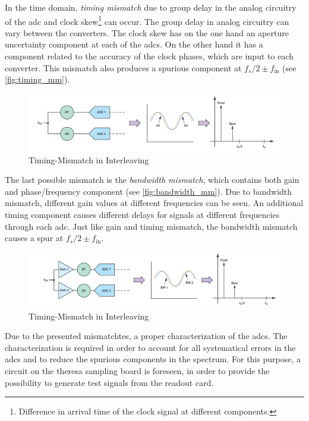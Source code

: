 In the time domain, \textit{timing mismatch} due to group delay in the analog circuitry of the \gls{adc} and clock skew\footnote{Difference in arrival time of the clock signal at different components.} can occur. 
The group delay in analog circuitry can vary between the converters. 
The clock skew has on the one hand an aperture uncertainty component at each of the \glspl{adc}. 
On the other hand it has a component related to the accuracy of the clock phases, which are input to each converter. \cite{Harris2019} 
This mismatch also produces a spurious component at $f_s/2 \pm f_\text{in}$ (see \autoref{fig:timing_mm}).
\begin{figure}[tbh]
	\centering
	\includegraphics[width = \textwidth]{chap/02-theory/img/timing_mm}
	\caption{Timing-Mismatch in Interleaving \cite{Harris2019}}
	\label{fig:timing_mm}
\end{figure}

The last possible mismatch is the \textit{bandwidth mismatch}, which contains both gain and phase/frequency component (see \autoref{fig:bandwidth_mm}). 
Due to bandwidth mismatch, different gain values at different frequencies can be seen. 
An additional timing component causes different delays for signals at different frequencies through each \gls{adc}. 
Just like gain and timing mismatch, the bandwidth mismatch causes a spur at $f_s/2 \pm f_\text{in}$.
\begin{figure}[tbh]
	\centering
	\includegraphics[width = \textwidth]{chap/02-theory/img/bandwidth_mm}
	\caption{Timing-Mismatch in Interleaving \cite{Harris2019}}
	\label{fig:bandwidth_mm}
\end{figure}

Due to the presented mismatchtes, a proper characterization of the \glspl{adc}.
The characterization is required in order to account for all systematical errors in the \glspl{adc} and to reduce the spurious components in the spectrum.
For this purpose, a circuit on the \gls{theresa} sampling board is foreseen, in order to provide the possibility to generate test signals from the readout card.

